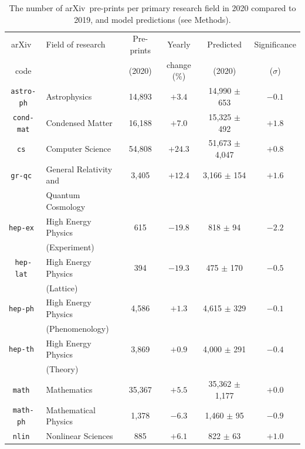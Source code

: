 \documentclass[]{rsos}%
\newcommand{\arxiv}{arXiv}
\begin{document}
\begin{table}
       \caption{The number of \arxiv\ pre-prints per primary research field in 2020 compared to 2019, and model predictions (see Methods).}
\begin{center}
\small
    \label{tab:table1}
    \begin{tabular}{|c|l|c|c|c|c|} 
    \hline
    	\arxiv\ & Field of research & Pre-prints & Yearly & Predicted & Significance \\
	code &&(2020)& change (\%)&(2020)& ($\sigma$)\\
      \hline
\texttt{astro-ph}    & Astrophysics           & 14,893    & $ +3.4$ & 14,990 $\pm$ 653      & $-0.1$ \\
\texttt{cond-mat}    & Condensed Matter       & 16,188    & $ +7.0$ & 15,325 $\pm$ 492      & $+1.8$ \\
\texttt{cs      }    & Computer Science       & 54,808    & $+24.3$ & 51,673 $\pm$ 4,047    & $+0.8$ \\
\texttt{gr-qc   }    & General Relativity and & 3,405     & $+12.4$ & 3,166 $\pm$ 154       & $+1.6$ \\
					 & Quantum Cosmology      &&&&\\
\texttt{hep-ex  }    & High Energy Physics    & 615       & $-19.8$ & 818 $\pm$ 94          & $-2.2$ \\
                     & (Experiment)           &&&&\\
\texttt{hep-lat }    & High Energy Physics    & 394       & $-19.3$ & 475 $\pm$ 170         & $-0.5$ \\
                     & (Lattice)              &&&&\\
\texttt{hep-ph  }    & High Energy Physics    & 4,586     & $ +1.3$ & 4,615 $\pm$ 329       & $-0.1$ \\
                     & (Phenomenology)        &&&&\\
\texttt{hep-th  }    & High Energy Physics    & 3,869     & $ +0.9$ & 4,000 $\pm$ 291       & $-0.4$ \\
                     & (Theory)               &&&&\\
\texttt{math    }    & Mathematics            & 35,367    & $ +5.5$ & 35,362 $\pm$ 1,177    & $+0.0$ \\
\texttt{math-ph }    & Mathematical Physics   & 1,378     & $ -6.3$ & 1,460 $\pm$ 95        & $-0.9$ \\
\texttt{nlin    }    & Nonlinear Sciences     & 885       & $ +6.1$ & 822 $\pm$ 63          & $+1.0$ \\

\end{tabular}
\end{center}
\end{table}
\end{document}
